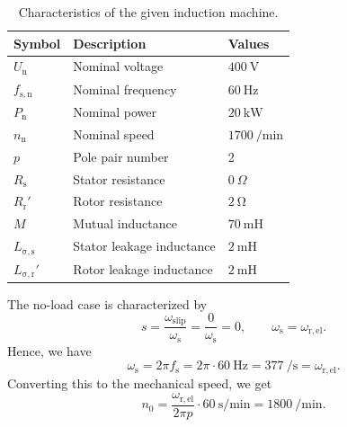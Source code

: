 \begin{table}[htb]
    \caption{Characteristics of the given induction machine.}
    \centering
    \begin{tabular}{lll}\toprule
    Symbol  & Description       & Values \\
    \midrule
    $U_{\mathrm{n}}$    & Nominal voltage           & $\SI{400}{\volt}$ \\
    $f_{\mathrm{s,n}}$  & Nominal frequency         & $\SI{60}{\hertz}$ \\
    $P_{\mathrm{n}}$    & Nominal power             & $\SI{20}{\kilo\watt}$ \\
    $n_{\mathrm{n}}$    & Nominal speed             & $\SI{1700}{\per\minute}$ \\
    $p$     & Pole pair number              & 2 \\
    \midrule
    $R_{\mathrm{s}}$    & Stator resistance         & $\SI{0}{\Omega}$ \\
    $R_{\mathrm{r}}'$    & Rotor resistance          & $\SI{2}{\ohm}$ \\
    $M$                 & Mutual inductance         & $\SI{70}{\milli\henry}$ \\
    $L_{\mathrm{\sigma,s}}$    & Stator leakage inductance  & $\SI{2}{\milli\henry}$ \\
    $L_{\mathrm{\sigma,r}}'$    & Rotor leakage inductance   & $\SI{2}{\milli\henry}$ \\
    \bottomrule
    \end{tabular}
    \label{tab:characteristicsIM_task3}
\end{table}

\begin{solutionblock}
    The no-load case is characterized by
    $$s = \frac{\omega_{\mathrm{slip}}}{\omega_{\mathrm{s}}} = \frac{0}{\omega_{\mathrm{s}}}=0, \qquad \omega_{\mathrm{s}} = \omega_{\mathrm{r,el}}.$$
    Hence, we have $$\omega_{\mathrm{s}} = 2\pi f_{\mathrm{s}} = 2\pi \cdot \SI{60}{\hertz} = \SI{377}{\per\second} = \omega_{\mathrm{r,el}}.$$ Converting this to the mechanical speed, we get
    $$n_0 = \frac{\omega_{\mathrm{r,el}}}{2 \pi p } \cdot \SI{60}{\second\per\minute} = \SI{1800}{\per\minute}.$$ 
\end{solutionblock}

